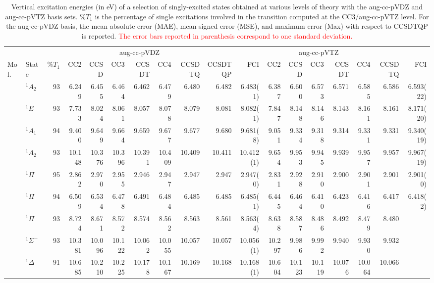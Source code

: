 \documentclass[aip,jcp,reprint,noshowkeys,superscriptaddress]{revtex4-1}
\newcommand{\alert}[1]{\textcolor{red}{#1}}
\newcommand{\mc}{\multicolumn}
\begin{document}
\begin{squeezetable}
\begin{table}
	\caption{Vertical excitation energies (in eV) of a selection of singly-excited states obtained at various levels of theory with the aug-cc-pVDZ and aug-cc-pVTZ basis sets. 
	$\%T_1$ is the percentage of single excitations involved in the transition computed at the CC3/aug-cc-pVTZ level.
	For the aug-cc-pVDZ basis, the mean absolute error (MAE), mean signed error (MSE), and maximum error (Max) with respect to CCSDTQP is reported.
	\alert{The error bars reported in parenthesis correspond to one standard deviation.}
	\label{tab:singles}}
	\begin{ruledtabular}
	\begin{tabular}{llrrrrrrrrrrrrrrrr}
				&		&	\mc{8}{c}{aug-cc-pVDZ}		&		\mc{7}{c}{aug-cc-pVTZ}		\\	
				\cline{4-11} \cline{12-18}
	Mol.	&	State	& $\%T_1$	&CC2	&CCSD	&CC3	&CCSDT	&CC4	&CCSDTQ	&CCSDTQP	&FCI	
									&CC2	&CCSD	&CC3	&CCSDT	&CC4	&CCSDTQ	&FCI			\\
	\hline
	\ce{NH3}	&	$^1A_2$ 		&93	&6.249	&6.455	&6.464	&6.462	&6.479	&6.480	&6.482	&6.483(1)	&6.387	&6.600	&6.573	&6.571	&6.585	&6.586	&6.593(22)	\\	
				&	$^1E$			&93	&7.733	&8.024	&8.061	&8.057	&8.078	&8.079	&8.081	&8.082(1)	&7.847	&8.148	&8.146	&8.143	&8.161	&8.161	&8.171(20)	\\	
				&	$^1A_1$ 		&94	&9.400	&9.649	&9.664	&9.659	&9.677	&9.677	&9.680	&9.681(8)	&9.051	&9.334	&9.318	&9.314	&9.331	&9.331	&9.340(19)	\\
				&	$^1A_2$ 		&93	&10.148	&10.376	&10.396	&10.391	&10.409	&10.409	&10.411	&10.412(1)	&9.654	&9.953	&9.945	&9.939	&9.957	&9.957	&9.967(19)	\\
	\ce{BH}		&	$^1\Pi$ 		&95	&2.862	&2.970	&2.955	&2.946	&2.947	&2.947	&2.947	&2.947(0)	&2.831	&2.928	&2.910	&2.900	&2.901	&2.901	&2.901(0)	\\
	\ce{BF}		&	$^1\Pi$ 		&94	&6.509	&6.534	&6.478	&6.491	&6.484	&6.485	&6.485	&6.485(1)	&6.445	&6.464	&6.410	&6.423	&6.416	&6.417	&6.418(2)\\
	\ce{CO}		&	$^1\Pi$ 		&93	&8.724	&8.671	&8.572	&8.574	&8.562	&8.563	&8.561	&8.563(4)	&8.638	&8.587	&8.486	&8.492	&8.479	&8.480	&	\\
				&	$^1\Sigma^-$ 	&93	&10.381	&10.096	&10.122	&10.062	&10.055	&10.057	&10.057	&10.056(1)	&10.297	&9.986	&9.992	&9.940	&9.930	&9.932	&	\\
				&	$^1\Delta$ 		&91	&10.685	&10.210	&10.225	&10.178	&10.167	&10.169	&10.168	&10.168(1)	&10.604	&10.123	&10.119	&10.076	&10.064	&10.066	&	\\

\end{tabular}
\end{ruledtabular}
\end{table}
\end{squeezetable}
\end{document}
